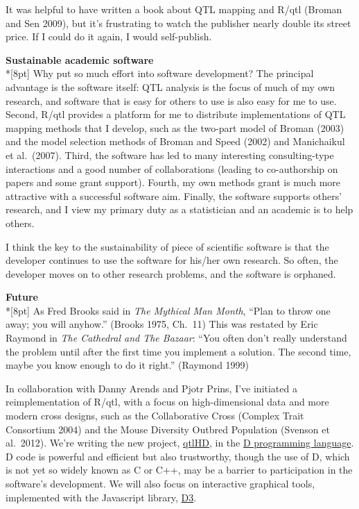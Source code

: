 \documentclass[letterpaper]{article}
\begin{document}
\begin{multicols}{2}
It was helpful to have written a book about QTL mapping and R/qtl
(Broman and Sen 2009), but it's frustrating to watch the publisher
nearly double its street price. If I could do it again, I would
self-publish.


\bigskip
{}
\noindent \textbf{\sffamily Sustainable academic software}\\*[8pt]
Why put so much effort into software development? The principal
advantage is the software itself: QTL analysis is the focus of much of
my own research, and software that is easy for others to use is also
easy for me to use. Second, R/qtl provides a platform for me to
distribute implementations of QTL mapping methods that I develop, such
as the two-part model of Broman (2003) and the model
selection methods of Broman and Speed (2002) and Manichaikul et
al.\ (2007). Third, the software has led to many interesting
consulting-type interactions and a good number of collaborations (leading
to co-authorship on papers and some grant support). Fourth, my own
methods grant is much more attractive with a successful software aim.
Finally, the software supports others' research, and I view my primary
duty as a statistician and an academic is to help others.

I think the key to the sustainability of piece of scientific software
is that the developer continues to use the software
for his/her own research. So often, the developer moves on to other
research problems, and the software is orphaned.

\bigskip
{}
\noindent \textbf{\sffamily Future} \\*[8pt]
As Fred Brooks said in \emph{The Mythical Man Month},
``Plan to throw one away; you will anyhow.'' (Brooks 1975,
Ch.\ 11) This was
restated by Eric Raymond in \emph{The Cathedral and The Bazaar}:
``You
often don't really understand the problem until after the first time
you implement a solution. The second time, maybe you know enough to do
it right.'' (Raymond 1999)

In collaboration with Danny Arends and Pjotr Prins, I've initiated a
reimplementation of R/qtl, with a focus on high-dimensional data and
more modern cross designs, such as the Collaborative Cross (Complex
Trait Consortium 2004)
and the Mouse Diversity Outbred Population (Svenson et al.\ 2012).
We're writing the new project, \href{https://github.com/qtlHD/qtlHD}{qtlHD},
in the \href{http://dlang.org/}{D programming language}. D code is powerful
and efficient but also trustworthy, though the use of D, which is not
yet so widely known as C or C++, may be a
barrier to participation in the software's development. We will also
focus on interactive graphical tools, implemented with the
Javascript library, \href{http://d3js.org/}{D3}.


\end{multicols}
\end{document}
